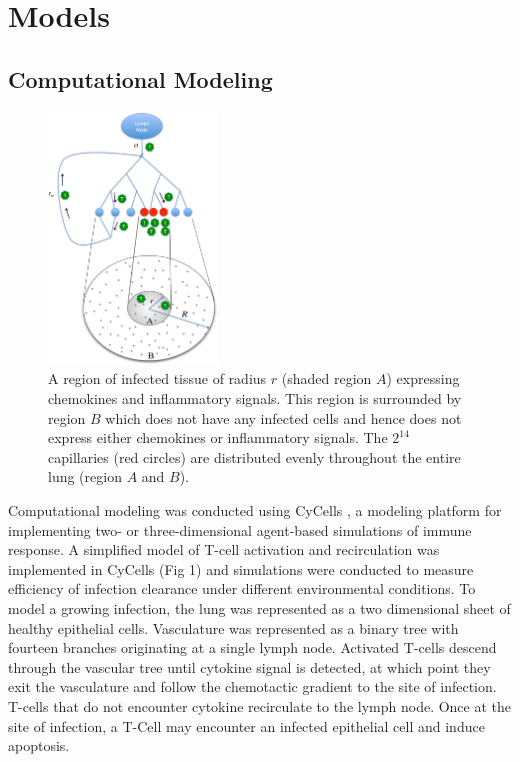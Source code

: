 \documentclass[10pt]{article}
\begin{document}
\section*{Models}


\subsection*{Computational Modeling}

\begin{figure}[ht!]
\begin{center}
\includegraphics[width=0.4\textwidth]{SystemChart}
\end{center}
\caption{A region of infected tissue of radius $r$ (shaded region $A$) expressing chemokines and inflammatory signals. This region is surrounded by region $B$ which does not have any infected cells and hence does not express either chemokines or inflammatory signals. The $2^{14}$ capillaries (red circles) are distributed evenly throughout the entire lung (region $A$ and $B$).}
\label{fig:systemchart}
\end{figure}

Computational modeling was conducted using CyCells \cite{Warrender2006}, a modeling platform for implementing two- or three-dimensional agent-based simulations of immune response. A simplified model of T-cell activation and recirculation was implemented in CyCells (Fig 1) and simulations were conducted to measure efficiency of infection clearance under different environmental conditions. To model a growing infection, the lung was represented as a two dimensional sheet of healthy epithelial cells. Vasculature was represented as a binary tree with fourteen branches originating at a single lymph node. Activated T-cells descend through the vascular tree until cytokine signal is detected, at which point they exit the vasculature and follow the chemotactic gradient to the site of infection. T-cells that do not encounter cytokine recirculate to the lymph node. Once at the site of infection, a T-Cell may encounter an infected epithelial cell and induce apoptosis.
\end{document}
